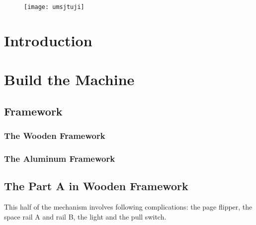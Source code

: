 \documentclass[twoside,a4paper]{refart}
\title{\tle}
\author{
Group Bluebear\\
Li Songqian\\
Ruan zhihao\\
Wu Yinyue\\
Zhou Ruixing
}
\begin{document}
\maketitle
\begin{figure}[b]
  \raggedleft
  \texttt{[image: umsjtuji]}\\
\end{figure}
\begin{abstract}
        A Rube Goldberg machine is a intentionally over-designed complex device, which involve a series of units or ``complications'' that linked together and then trigger one after another with a simple task finished at the end. Our machine is designed for the study room and for the people who enjoy reading. It is able to switch on the light, flip pages of a book and make tea for the user, with only one trigger. This manual will present you the all the complications in this machines and how to build them.
\end{abstract}




\tableofcontents

\newpage



\section{Introduction}
\section{Build the Machine}
\subsection{Framework}
\subsubsection{The Wooden Framework}
\subsubsection{The Aluminum Framework}
\subsection{The Part A in Wooden Framework}
This half of the mechanism involves following complications: the page flipper, the space rail A and rail B, the light and the pull switch. 
\end{document}
